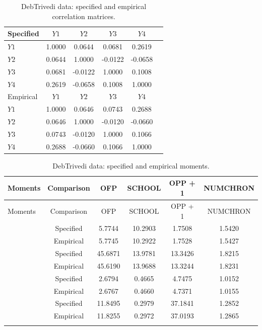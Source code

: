 \begin{table}[H]
\caption{DebTrivedi data: specified and empirical correlation matrices.}
\centering 
\begin{tabular}{lccccc} 
\toprule
Specified  & $Y1$ & $Y2$ & $Y3$ & $Y4$
\\ [0.5ex]
\midrule
$Y1$ & 1.0000 & 0.0644 & 0.0681 & 0.2619 \\ 

$Y2$ & 0.0644 & 1.0000 & -0.0122 & -0.0658 \\

$Y3$ & 0.0681 & -0.0122 & 1.0000 & 0.1008 \\

$Y4$ & 0.2619 & -0.0658 & 0.1008 & 1.0000 \\

\midrule

Empirical & $Y1$ & $Y2$ & $Y3$ & $Y4$ \\ [0.5ex]
\midrule
$Y1$ & 1.0000 & 0.0646 & 0.0743 & 0.2688 \\

$Y2$ & 0.0646 & 1.0000 & -0.0120 & -0.0660 \\

$Y3$ & 0.0743 & -0.0120 & 1.0000 & 0.1066 \\

$Y4$ & 0.2688 & -0.0660 & 0.1066 & 1.0000 \\
[0.5ex]
\bottomrule
\end{tabular}
\end{table}

\begin{longtable}[htbp]{lccccc} 
\caption{DebTrivedi data: specified and empirical moments.} \\
\toprule
Moments & Comparison & OFP & SCHOOL & OPP + 1 & NUMCHRON
\\ [0.5ex]
\midrule
\endfirsthead
\toprule
Moments & Comparison & OFP & SCHOOL & OPP + 1 & NUMCHRON
\\ [0.5ex]
\midrule
\endhead
&Specified & 5.7744 & 10.2903 & 1.7508 & 1.5420 \\[-1ex]
\raisebox{1.5ex}{Mean$(\mu)$} 
&Empirical & 5.7745 & 10.2922 & 1.7528 & 1.5427 \\
[0.5ex]\midrule
& Specified & 45.6871 & 13.9781 & 13.3426 & 1.8215 \\[-1ex]
\raisebox{1.5ex}{Variance$(\sigma^2)$} 
& Empirical & 45.6190 & 13.9688 & 13.3244 & 1.8231  \\
[0.5ex]\midrule
& Specified & 2.6794 & 0.4665 & 4.7475 & 1.0152 \\[-1ex]
\raisebox{1.5ex}{Skewness$(\nu_1)$} 
& Empirical & 2.6767  & 0.4660 & 4.7371 & 1.0155 \\
[0.5ex]\midrule
&Specified & 11.8495 & 0.2979 &  37.1841 & 1.2852 \\[-1ex]
\raisebox{1.5ex}{Kurtosis$(\nu_2)$} 
& Empirical & 11.8255 & 0.2972 & 37.0193 & 1.2865 \\[0.5ex]
\bottomrule
\label{tab:PPer}
\end{longtable}


